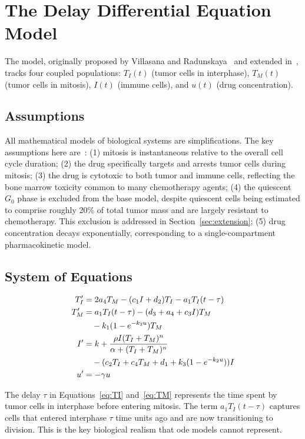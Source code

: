 \section{The Delay Differential Equation Model}
\label{sec:model}

The model, originally proposed by Villasana and Radunskaya~\cite{villasana2003} and extended in~\cite{villasana2004}, tracks four coupled populations: $T_I(t)$ (tumor cells in interphase), $T_M(t)$ (tumor cells in mitosis), $I(t)$ (immune cells), and $u(t)$ (drug concentration).

\subsection{Assumptions}

All mathematical models of biological systems are simplifications. The key assumptions here are~\cite{villasana2003}: (1) mitosis is instantaneous relative to the overall cell cycle duration; (2) the drug specifically targets and arrests tumor cells during mitosis; (3) the drug is cytotoxic to both tumor and immune cells, reflecting the bone marrow toxicity common to many chemotherapy agents; (4) the quiescent $G_0$ phase is excluded from the base model, despite quiescent cells being estimated to comprise roughly 20\% of total tumor mass and are largely resistant to chemotherapy. This exclusion is addressed in Section~\ref{sec:extension}; (5) drug concentration decays exponentially, corresponding to a single-compartment pharmacokinetic model.

\subsection{System of Equations}

\begin{align}
  T_I' &= 2a_4T_M - (c_1I + d_2)T_I - a_1T_I(t-\tau) \label{eq:TI} \\
  T_M' &= a_1T_I(t-\tau) - (d_3 + a_4 + c_3I)T_M \notag \\
       &\quad - k_1(1-e^{-k_2u})T_M \label{eq:TM} \\
  I'   &= k + \frac{\rho I(T_I+T_M)^n}{\alpha+(T_I+T_M)^n} \notag \\
       &\quad - (c_2T_I + c_4T_M + d_1 + k_3(1-e^{-k_2u}))I \label{eq:I} \\
  u'   &= -\gamma u \label{eq:u}
\end{align}

The delay $\tau$ in Equations~\ref{eq:TI} and~\ref{eq:TM} represents the time spent by tumor cells in interphase before entering mitosis. The term $a_1T_I(t-\tau)$ captures cells that entered interphase $\tau$ time units ago and are now transitioning to division. This is the key biological realism that \gls{ode} models cannot represent.

